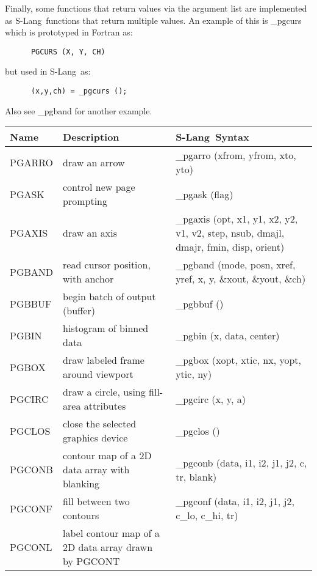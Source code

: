 \documentclass{book}
\newcommand{\slang}{{\sc S-Lang}}
\begin{document}
{Finally, some functions that return values via the argument list are
implemented as \slang\  functions that return multiple values.  An example
of this is \_pgcurs which is prototyped in {\sc Fortran} as:
\begin{verbatim}
      PGCURS (X, Y, CH)
\end{verbatim}
but used in \slang\  as:
\begin{verbatim}
      (x,y,ch) = _pgcurs ();
\end{verbatim}
Also see \_pgband for another example.

\vfill
\newpage

\begin{center}
\begin{tabular}{|l|p{2.5in}|p{2.25in}|}
\hline
Name &  Description & \slang\ Syntax \\
\hline
\hline
PGARRO & draw an arrow                                                  &
\_pgarro (xfrom, yfrom, xto, yto) \\
PGASK & control new page prompting                                      &
\_pgask (flag) \\
PGAXIS & draw an axis                                                   &
\_pgaxis (opt, x1, y1, x2, y2, v1, v2, step, nsub, dmajl, dmajr, fmin, disp, orient) \\
PGBAND & read cursor position, with anchor                                 &
\_pgband (mode, posn, xref, yref, x, y, \&xout, \&yout, \&ch) \\
PGBBUF & begin batch of output (buffer)                                 &
\_pgbbuf () \\
PGBIN & histogram of binned data                                        &
\_pgbin (x, data, center) \\
PGBOX & draw labeled frame around viewport                              &
\_pgbox (xopt, xtic, nx, yopt, ytic, ny) \\
PGCIRC & draw a circle, using fill-area attributes                      &
\_pgcirc (x, y, a) \\
PGCLOS & close the selected graphics device                             &
\_pgclos () \\
PGCONB & contour map of a 2D data array with blanking      &
\_pgconb (data, i1, i2, j1, j2, c, tr, blank) \\
PGCONF & fill between two contours                                      &
\_pgconf (data, i1, i2, j1, j2, c\_lo, c\_hi, tr) \\
PGCONL & label contour map of a 2D data array drawn by PGCONT       &

\end{tabular}
\end{center}}
\end{document}
